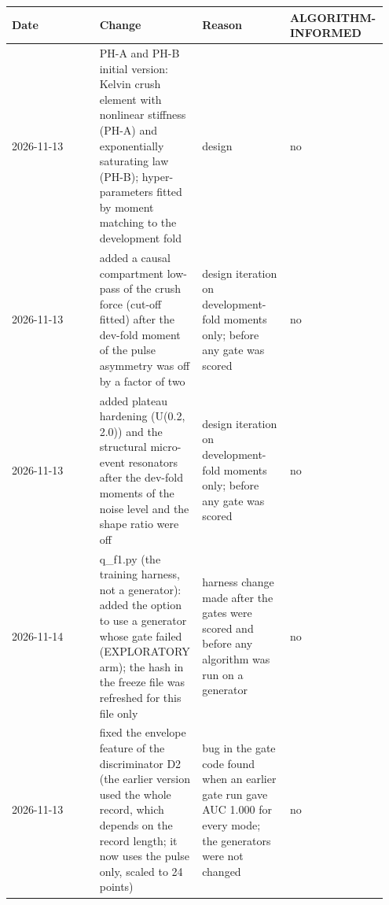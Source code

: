 {\scriptsize\raggedright
\begin{longtable}{p{0.237\linewidth}p{0.237\linewidth}p{0.237\linewidth}p{0.237\linewidth}}
\toprule
Date & Change & Reason & ALGORITHM-INFORMED \\
\midrule
\endhead
2026-11-13 & PH-A and PH-B initial version: Kelvin crush element with nonlinear stiffness (PH-A) and exponentially saturating law (PH-B); hyper-parameters fitted by moment matching to the development fold & design & no \\
2026-11-13 & added a causal compartment low-pass of the crush force (cut-off fitted) after the dev-fold moment of the pulse asymmetry was off by a factor of two & design iteration on development-fold moments only; before any gate was scored & no \\
2026-11-13 & added plateau hardening (U(0.2, 2.0)) and the structural micro-event resonators after the dev-fold moments of the noise level and the shape ratio were off & design iteration on development-fold moments only; before any gate was scored & no \\
2026-11-14 & q\_f1.py (the training harness, not a generator): added the option to use a generator whose gate failed (EXPLORATORY arm); the hash in the freeze file was refreshed for this file only & harness change made after the gates were scored and before any algorithm was run on a generator & no \\
2026-11-13 & fixed the envelope feature of the discriminator D2 (the earlier version used the whole record, which depends on the record length; it now uses the pulse only, scaled to 24 points) & bug in the gate code found when an earlier gate run gave AUC 1.000 for every mode; the generators were not changed & no \\
\bottomrule
\end{longtable}}

